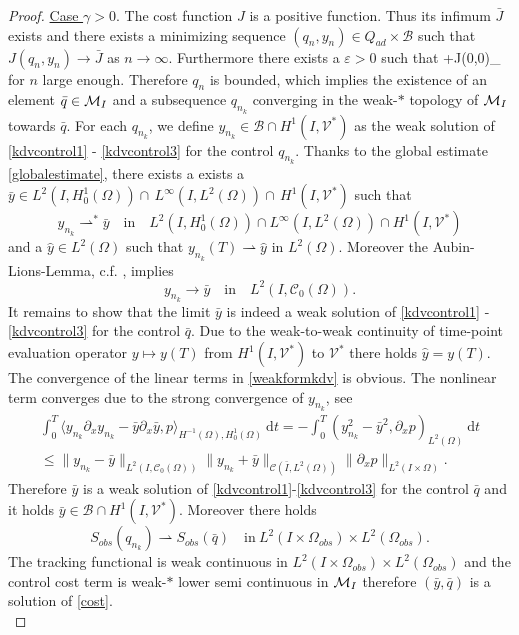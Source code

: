 \begin{proof}
\underline{Case $\gamma > 0$}. The cost function $J$ is a positive function. Thus its infimum $\bar J$ exists and there exists a minimizing sequence $(q_n,y_n) \in Q_{ad} \times \mathcal B$ such that $J(q_n, y_n) \rightarrow \bar J$ as $n \rightarrow \infty$. Furthermore there exists a $\varepsilon>0$ such that
\be
\varepsilon+J(0,0)\geq \alpha {}_{\M}
\ee
for $n$ large enough. Therefore $q_n$ is bounded, which implies the existence of an element $\bar q\in\mathcal{M}_I$ and a subsequence $q_{n_k}$ converging in the weak-$*$ topology of $\mathcal{M}_I$ towards $\bar q$. For each $q_{n_k}$, we define $y_{n_k}\in \mathcal B\cap H^1(I,\mathcal V^*)$ as the weak solution of \eqref{kdvcontrol1} - \eqref{kdvcontrol3} for the control $q_{n_k}$. Thanks to the global estimate \eqref{globalestimate}, there exists a exists a $\bar y\in L^2(I,H^1_0(\Omega))\cap\,L^\infty(I,L^2(\Omega))\cap\,H^1(I,\mathcal V^\ast)$ such that
\[y_{n_k}\rightharpoonup^\ast\bar y\quad\text{in}\quad L^2(I,H^1_0(\Omega))\cap L^{\infty}(I,L^2(\Omega))\cap H^1(I,\mathcal V^\ast)\]
and a $\hat y\in L^2(\Omega)$ such that $y_{n_k}(T)\rightharpoonup \hat y$ in $L^2(\Omega)$. Moreover the Aubin-Lions-Lemma, c.f. \cite[Chapter 3, Proposition 1.3]{showalter97}, implies
\[y_{n_k}\rightarrow\bar y\quad\text{in}\quad L^2(I,\mathcal C_0(\Omega)).\]
It remains to show that the limit $\bar y$ is indeed a weak solution of \eqref{kdvcontrol1} - \eqref{kdvcontrol3} for the control $\bar q$. Due to the weak-to-weak continuity of time-point evaluation operator $y\mapsto y(T)$ from $H^1(I,\mathcal V^\ast)$ to $\mathcal V^\ast$ there holds $\hat y=y(T)$.  The convergence of the linear terms in \eqref{weakformkdv} is obvious. The nonlinear term converges due to the strong convergence of $y_{n_k}$, see
\begin{multline*}
\int_0^T\langle y_{n_k}\partial_xy_{n_k}-\bar y\partial_x\bar y,p\rangle_{H^{-1}(\Omega),H^1_0(\Omega)}~\mathrm dt=-\int_0^T(y_{n_k}^2-\bar y^2,\partial_x p)_{L^2(\Omega)}~\mathrm dt\\
\leq\|y_{n_k}-\bar y\|_{L^2(I,\mathcal C_0(\Omega))}\|y_{n_k}+\bar y\|_{\mathcal C(\bar I,L^2(\Omega))}\|\partial_x p\|_{L^2(I\times \Omega)}.
\end{multline*}
Therefore $\bar y$ is a weak solution of \eqref{kdvcontrol1}-\eqref{kdvcontrol3} for the control $\bar q$ and it holds $\bar y\in \mathcal B\cap H^1(I,\mathcal V^*)$. Moreover there holds 
\[S_{obs}(q_{n_k})\rightharpoonup S_{obs}(\bar q)\quad\text{in}~ L^2(I\times \Omega_{obs})\times L^2(\Omega_{obs}).\] The tracking functional is weak continuous in $ L^2(I\times \Omega_{obs})\times L^2(\Omega_{obs})$ and the control cost term is weak-$*$ lower semi continuous in $\mathcal{M}_I$ therefore $(\bar y,\bar q)$ is a solution of \eqref{cost}.\\

\end{proof}
